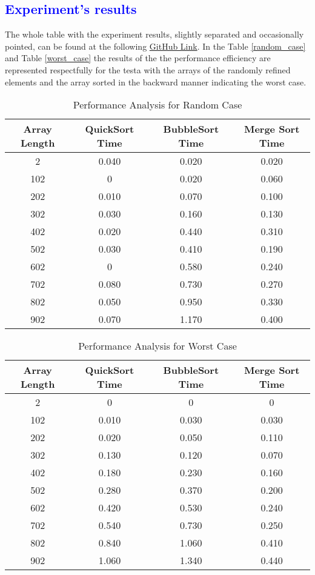 \textcolor{blue}{\section{Experiment's results}}

The whole table with the experiment results, slightly separated and occasionally pointed, can be found at the following \href{https://github.com/SaintAngeLs/solvd_nodejs_course}{GitHub Link}. In the Table \ref{random_case} and Table \ref{worst_case} the results of the the performance efficiency are represented respectfully for the testa with the arrays of the randomly refined elements and the array sorted in the backward manner indicating the worst case.

\begin{table}[h!]
\centering
\caption{Performance Analysis for Random Case}
\label{table:random_case}
\begin{tabular}{@{}cccc@{}}
\toprule
Array Length & QuickSort Time & BubbleSort Time & Merge Sort Time \\
\midrule
2 & 0.040 & 0.020 & 0.020 \\
102 & 0 & 0.020 & 0.060 \\
202 & 0.010 & 0.070 & 0.100 \\
302 & 0.030 & 0.160 & 0.130 \\
402 & 0.020 & 0.440 & 0.310 \\
502 & 0.030 & 0.410 & 0.190 \\
602 & 0 & 0.580 & 0.240 \\
702 & 0.080 & 0.730 & 0.270 \\
802 & 0.050 & 0.950 & 0.330 \\
902 & 0.070 & 1.170 & 0.400 \\
\bottomrule
\end{tabular}
\end{table}

\begin{table}[h!]
\centering
\caption{Performance Analysis for Worst Case}
\label{table:worst_case}
\begin{tabular}{@{}cccc@{}}
\toprule
Array Length & QuickSort Time & BubbleSort Time & Merge Sort Time \\
\midrule
2 & 0 & 0 & 0 \\
102 & 0.010 & 0.030 & 0.030 \\
202 & 0.020 & 0.050 & 0.110 \\
302 & 0.130 & 0.120 & 0.070 \\
402 & 0.180 & 0.230 & 0.160 \\
502 & 0.280 & 0.370 & 0.200 \\
602 & 0.420 & 0.530 & 0.240 \\
702 & 0.540 & 0.730 & 0.250 \\
802 & 0.840 & 1.060 & 0.410 \\
902 & 1.060 & 1.340 & 0.440 \\
\bottomrule
\end{tabular}
\end{table}

